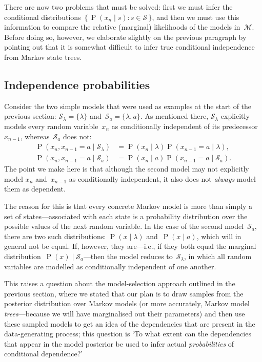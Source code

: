 \documentclass[11pt,a4paper]{article}
\newcommand\mc[1]{\mathcal{#1}}               %
\DeclareMathOperator\Pb{P}                    %
\newcommand\peq{\mathop{=}}              %
\begin{document}
There are now two problems that must be solved: first we must infer the
conditional distributions~\(\{\,\Pb(x_n \mid s) : s \in \mc{S}\,\}\), and then
we must use this information to compare the relative (marginal) likelihoods of
the models in~\(\mc{M}\). Before doing so, however, we elaborate slightly on the
previous paragraph by pointing out that it is somewhat difficult to infer true
conditional independence from Markov state trees.

\subsection{Independence probabilities}\label{sec:independence} %

Consider the two simple models that were used as examples at the start of the
previous section: \(\mc{S}_{\lambda} = \{\lambda\}\) and~\(\mc{S}_a = \{\lambda,
a\}\). As mentioned there, \(\mc{S}_{\lambda}\) explicitly models every random
variable~\(x_n\) as conditionally independent of its predecessor~\(x_{n-1}\),
whereas~\(\mc{S}_a\) does not:
\begin{align*}
  \Pb(x_n, x_{n-1} \peq a \mid \mc{S}_{\lambda}) &=
    \Pb(x_n \mid \lambda) \Pb(x_{n-1} \peq a \mid \lambda), \\
  \Pb(x_n, x_{n-1} \peq a \mid \mc{S}_a) &=
    \Pb(x_n \mid a) \Pb(x_{n-1} \peq a \mid \mc{S}_a).
\end{align*}
The point we make here is that although the second model may not explicitly
model \(x_n\) and~\(x_{n-1}\) as conditionally independent, it also does not
\emph{always} model them as dependent.

The reason for this is that every concrete Markov model is more than simply a
set of states---associated with each state is a probability distribution over
the possible values of the next random variable. In the case of the second
model~\(\mc{S}_a\), there are two such distributions: \(\Pb(x \mid \lambda)\)
and~\(\Pb(x \mid a)\), which will in general not be equal. If, however, they
are---i.e., if they both equal the marginal distribution~\(\Pb(x) \mid
\mc{S}_a\)---then the model reduces to~\(\mc{S}_{\lambda}\), in which all random
variables are modelled as conditionally independent of one another.

This raises a question about the model-selection approach outlined in the
previous section, where we stated that our plan is to draw samples from the
posterior distribution over Markov models (or more accurately, Markov model
\emph{trees}---because we will have marginalised out their parameters) and then
use these sampled models to get an idea of the dependencies that are present in
the data-generating process; this question is `To what extent can the
dependencies that appear in the model posterior be used to infer actual
\emph{probabilities} of conditional dependence?'
\end{document}
